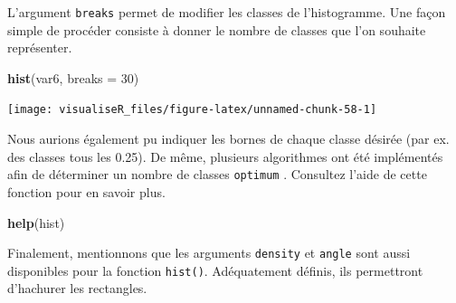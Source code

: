 \documentclass[]{article}
\newenvironment{Shaded}{\begin{snugshade}}{\end{snugshade}}
\newcommand{\CommentTok}[1]{\textcolor[rgb]{0.56,0.35,0.01}{\textit{#1}}}
\newcommand{\DataTypeTok}[1]{\textcolor[rgb]{0.13,0.29,0.53}{#1}}
\newcommand{\DecValTok}[1]{\textcolor[rgb]{0.00,0.00,0.81}{#1}}
\newcommand{\KeywordTok}[1]{\textcolor[rgb]{0.13,0.29,0.53}{\textbf{#1}}}
\newcommand{\NormalTok}[1]{#1}
\newcommand{\OtherTok}[1]{\textcolor[rgb]{0.56,0.35,0.01}{#1}}
\begin{document}
\begin{Shaded}
\end{Shaded}

L'argument \texttt{breaks} permet de modifier les classes de l'histogramme. Une façon
simple de procéder consiste à donner le nombre de classes que l'on souhaite
représenter.

\begin{Shaded}
\begin{Highlighting}[]
\KeywordTok{hist}\NormalTok{(var6, }\DataTypeTok{breaks =} \DecValTok{30}\NormalTok{)}
\end{Highlighting}
\end{Shaded}

\begin{center}\texttt{[image: visualiseR\_files/figure-latex/unnamed-chunk-58-1]} \end{center}

Nous aurions également pu indiquer les bornes de chaque classe désirée (par ex.
des classes tous les 0.25). De même, plusieurs algorithmes ont été implémentés
afin de déterminer un nombre de classes \texttt{optimum} . Consultez l'aide de cette
fonction pour en savoir plus.

\begin{Shaded}
\begin{Highlighting}[]
\KeywordTok{help}\NormalTok{(hist)}
\end{Highlighting}
\end{Shaded}

Finalement, mentionnons que les arguments \texttt{density} et \texttt{angle} sont aussi disponibles pour la fonction \texttt{hist()}. Adéquatement définis, ils permettront d'hachurer les rectangles.
\end{document}

